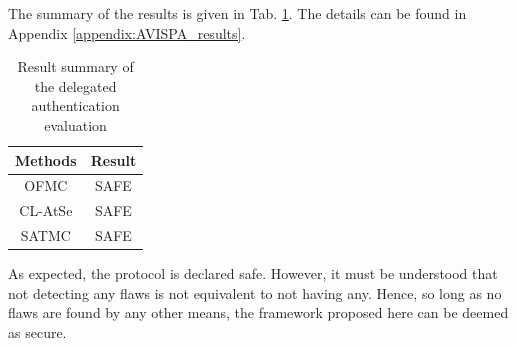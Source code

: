 The summary of the results is given in Tab. \ref{tab:result_2}. The details can be found in Appendix \ref{appendix:AVISPA_results}.

\begin{table}[!t]
		\centering
		\caption{Result summary of the delegated authentication evaluation}
		\label{tab:result_2}
		\begin{tabular}{|c|c|}
			\hline Methods &  Result\\ 
			\hline OFMC & SAFE \\ 
			\hline CL-AtSe & SAFE \\ 
			\hline SATMC & SAFE \\ 
			\hline 
		\end{tabular} 
\end{table}


As expected, the protocol is declared safe. However, it must be understood that not detecting any flaws is not equivalent to not having any. Hence, so long as no flaws are found by any other means, the framework proposed here can be deemed as secure.





